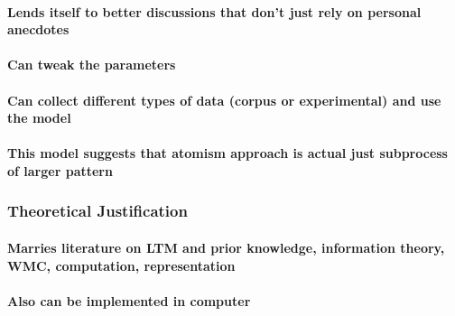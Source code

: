 \documentclass[]{book}
\let\oldparagraph\paragraph
\renewcommand{\paragraph}[1]{\oldparagraph{#1}\mbox{}}
\theoremstyle{definition}
\theoremstyle{definition}
\theoremstyle{definition}
\theoremstyle{remark}
\begin{document}
\hypertarget{lends-itself-to-better-discussions-that-dont-just-rely-on-personal-anecdotes}{%
\paragraph{Lends itself to better discussions that don't just rely on
personal
anecdotes}\label{lends-itself-to-better-discussions-that-dont-just-rely-on-personal-anecdotes}}

\hypertarget{can-tweak-the-parameters}{%
\paragraph{Can tweak the parameters}\label{can-tweak-the-parameters}}

\hypertarget{can-collect-different-types-of-data-corpus-or-experimental-and-use-the-model}{%
\paragraph{Can collect different types of data (corpus or experimental)
and use the
model}\label{can-collect-different-types-of-data-corpus-or-experimental-and-use-the-model}}

\hypertarget{this-model-suggests-that-atomism-approach-is-actual-just-subprocess-of-larger-pattern}{%
\paragraph{This model suggests that atomism approach is actual just
subprocess of larger
pattern}\label{this-model-suggests-that-atomism-approach-is-actual-just-subprocess-of-larger-pattern}}

\hypertarget{theoretical-justification}{%
\subsubsection{Theoretical
Justification}\label{theoretical-justification}}

\hypertarget{marries-literature-on-ltm-and-prior-knowledge-information-theory-wmc-computation-representation}{%
\paragraph{Marries literature on LTM and prior knowledge, information
theory, WMC, computation,
representation}\label{marries-literature-on-ltm-and-prior-knowledge-information-theory-wmc-computation-representation}}

\hypertarget{also-can-be-implemented-in-computer}{%
\paragraph{Also can be implemented in
computer}\label{also-can-be-implemented-in-computer}}
\end{document}
